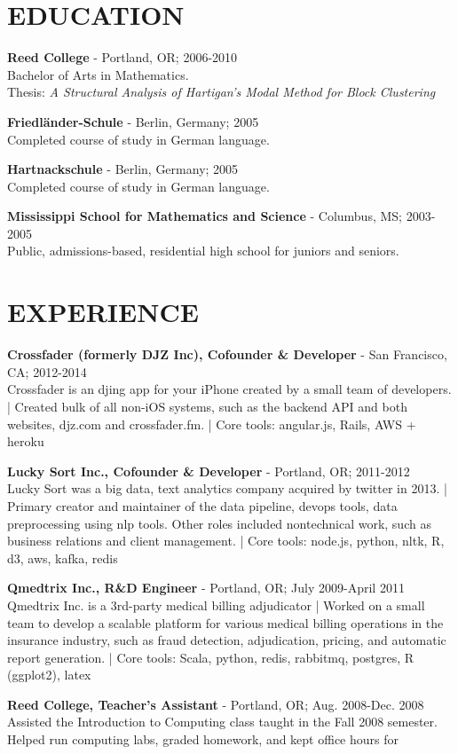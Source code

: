 \documentclass[11pt, line, margin]{res}
\newcommand{\prettysection}[1]{\setromanfont{TitilliumTitle20}\section{#1}\setromanfont{TitilliumText22L}}
\begin{document}


\begin{resume}
\prettysection{EDUCATION}
{\bf Reed College} -  Portland, OR; 2006-2010 \\ 
Bachelor of Arts in Mathematics. \\
Thesis: \textit{A Structural Analysis of Hartigan's Modal Method for
  Block Clustering}

{\bf Friedl\"{a}nder-Schule} - Berlin, Germany; 2005 \\
Completed course of study in German
language. 

{\bf Hartnackschule} - Berlin, Germany; 2005 \\ 
Completed course of study in German language. 

{\bf Mississippi School for Mathematics and Science} - Columbus, MS; 2003-2005 \\ 
Public, admissions-based, residential high school for juniors and seniors. 

\prettysection{EXPERIENCE}

{\bf Crossfader (formerly DJZ Inc), Cofounder & Developer} - San Francisco, CA; 2012-2014 \\
Crossfader is an djing app for your iPhone created by a small team of
developers. | Created bulk of all non-iOS systems, such as the backend
API and both websites, djz.com and crossfader.fm. | Core tools:
angular.js, Rails, AWS + heroku

{\bf Lucky Sort Inc., Cofounder & Developer} - Portland, OR; 2011-2012 \\
Lucky Sort was a big data, text analytics company acquired by
twitter in 2013. | Primary creator and maintainer of the data pipeline,
devops tools, data preprocessing using nlp tools.  Other roles
included nontechnical work, such as business relations and client
management. | Core tools: node.js, python, nltk, R, d3, aws, kafka, redis

{\bf Qmedtrix Inc., R\&D Engineer} - Portland, OR; July 2009-April 2011 \\
Qmedtrix Inc. is a 3rd-party medical billing adjudicator | Worked on a small team to develop a scalable platform for various
medical billing operations in the insurance industry, such as fraud detection, adjudication,
pricing, and automatic report generation.  | Core tools: Scala,
python, redis, rabbitmq, postgres, R (ggplot2), latex

{\bf Reed College, Teacher's Assistant} - Portland, OR;
Aug. 2008-Dec. 2008 \\
Assisted the Introduction to Computing class taught in the Fall 2008
semester. Helped run computing labs, graded homework, and kept office hours for



\end{resume}
\end{document}

